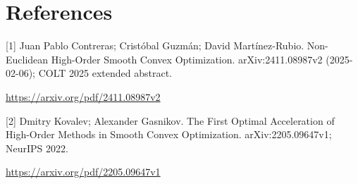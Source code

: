 \documentclass[10pt,a4paper]{article}
\begin{document}
\section{References}
[1] Juan Pablo Contreras; Cristóbal Guzmán; David Martínez-Rubio. Non-Euclidean High-Order Smooth Convex Optimization. arXiv:2411.08987v2 (2025-02-06); COLT 2025 extended abstract.

\url{https://arxiv.org/pdf/2411.08987v2}

[2] Dmitry Kovalev; Alexander Gasnikov. The First Optimal Acceleration of High-Order Methods in Smooth Convex Optimization. arXiv:2205.09647v1; NeurIPS 2022.

\url{https://arxiv.org/pdf/2205.09647v1}
\end{document}
